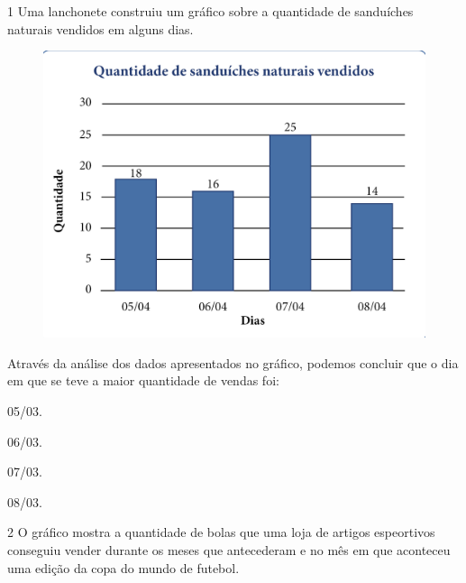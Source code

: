 \pagebreak
{}

\num{1} Uma lanchonete construiu um gráfico sobre a quantidade de
sanduíches naturais vendidos em alguns dias.

\begin{figure}[htpb!]
\centering
\includegraphics[width=\textwidth]{../ilustracoes/MAT5/SAEB_5ANO_MAT_figura64.png}
\end{figure}

Através da análise dos dados apresentados no gráfico, podemos concluir
que o dia em que se teve a maior quantidade de vendas foi:

\begin{minipage}{.5\textwidth}
\begin{escolha}
\item
  05/03.
\item
  06/03.
\item
  07/03.
\item
  08/03.
\end{escolha}
\end{minipage}

\pagebreak
\num{2} O gráfico mostra a quantidade de bolas que uma loja de
artigos espeortivos conseguiu vender durante os meses que antecederam e no mês em que aconteceu uma edição da copa do mundo de futebol.

